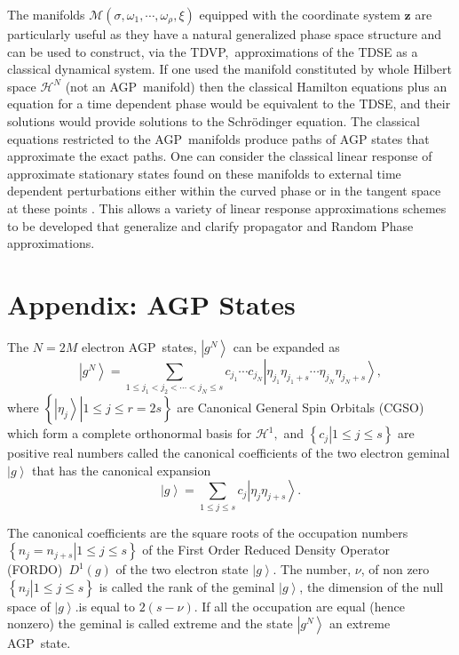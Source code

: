\documentclass[12pt,aps,amsfonts,amssymb,tightenlines]{revtex4}%
\begin{document}
The manifolds $\mathcal{M}\left(  \sigma,\omega_{1},\cdots,\omega_{\rho}%
,\xi\right)  $ equipped with the coordinate system $\mathbf{z}$ are
particularly useful as they have a natural generalized phase space structure
and can be used to construct, via the TDVP,\ approximations of the TDSE as a
classical dynamical system. If one used the manifold constituted by whole
Hilbert space $\mathcal{H}^{N}$ (not an AGP\ manifold) then the classical
Hamilton equations plus an equation for a time dependent phase would be
equivalent to the TDSE, and their solutions would provide solutions to the
Schr\"{o}dinger equation. The classical equations restricted to the
AGP\ manifolds produce paths of AGP states that approximate the exact paths.
One can consider the classical linear response of approximate stationary
states found on these manifolds to external time dependent perturbations
either within the curved phase or in the tangent space at these points
\cite{Weiner94}. This allows a variety of linear response approximations
schemes to be developed that generalize and clarify propagator and Random
Phase approximations.

\appendix

\section{Appendix: AGP States \label{agp}}

The $N=2M$ electron AGP\ states, $\left\vert g^{N}\right\rangle $ can be
expanded as
\begin{equation}
\left\vert g^{N}\right\rangle =\sum_{1\leq j_{1}<j_{2}<\cdots<j_{N}\leq
s}c_{j_{1}}\cdots c_{j_{N}}\left\vert \eta_{j_{1}}\eta_{j_{1}+s}\cdots
\eta_{j_{N}}\eta_{j_{N}+s}\right\rangle ,
\end{equation}
where $\left\{  \left.  \left\vert \eta_{j}\right\rangle \right\vert 1\leq
j\leq r=2s\right\}  $ are Canonical General Spin Orbitals (CGSO) which form a
complete orthonormal basis for $\mathcal{H}^{1},$ and $\left\{  \left.
c_{j}\right\vert 1\leq j\leq s\right\}  $ are positive real numbers called the
canonical coefficients of the two electron geminal $\left\vert g\right\rangle
$ that has the canonical expansion
\begin{equation}
\left\vert g\right\rangle =\sum_{1\leq j\leq s}c_{j}\left\vert \eta_{j}%
\eta_{j+s}\right\rangle . \label{gemexp}%
\end{equation}


The canonical coefficients are the square roots of the occupation numbers
$\left\{  \left.  n_{j}=n_{j+s}\right\vert 1\leq j\leq s\right\}  $ of the
First Order Reduced Density Operator (FORDO)\ $D^{1}\left(  g\right)  $ of the
two electron state $\left\vert g\right\rangle $. The number, $\nu$, of non
zero $\left\{  \left.  n_{j}\right\vert 1\leq j\leq s\right\}  $ is called the
rank of the geminal $\left\vert g\right\rangle $, the dimension of the null
space of $\left\vert g\right\rangle .$is equal to $2\left(  s-\nu\right)  $.
If all the occupation are equal (hence nonzero) the geminal is called extreme
and the state $\left\vert g^{N}\right\rangle $ an extreme AGP\ state.
\end{document}

